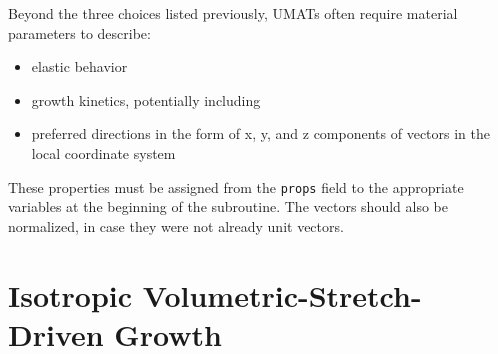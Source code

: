 \documentclass[10pt,letterpaper,oneside]{report}
\begin{document}
Beyond the three choices listed previously, UMATs often require material parameters to describe: 
\begin{itemize}
\item elastic behavior
\item growth kinetics, potentially including
\item preferred directions in the form of x, y, and z components of vectors in the local coordinate system
\end{itemize}
These properties must be assigned from the \texttt{props} field to the appropriate variables at the beginning of the subroutine.  The vectors should also be normalized, in case they were not already unit vectors.  


\section{Isotropic Volumetric-Stretch-Driven Growth}
\end{document}
